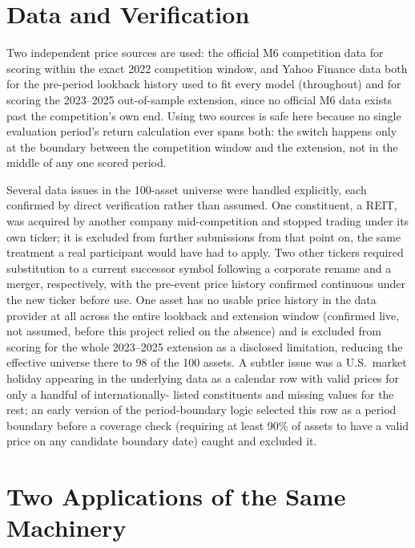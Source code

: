 \documentclass[11pt]{article}
\begin{document}
\section{Data and Verification}
\label{sec:data}

Two independent price sources are used: the official M6 competition data for
scoring within the exact 2022 competition window, and Yahoo Finance data both
for the pre-period lookback history used to fit every model (throughout) and
for scoring the 2023--2025 out-of-sample extension, since no official M6 data
exists past the competition's own end. Using two sources is safe here because
no single evaluation period's return calculation ever spans both: the switch
happens only at the boundary between the competition window and the
extension, not in the middle of any one scored period.

Several data issues in the 100-asset universe were handled explicitly, each
confirmed by direct verification rather than assumed. One constituent, a REIT,
was acquired by another company mid-competition and stopped trading under its
own ticker; it is excluded from further submissions from that point on, the
same treatment a real participant would have had to apply. Two other tickers
required substitution to a current successor symbol following a corporate
rename and a merger, respectively, with the pre-event price history confirmed
continuous under the new ticker before use. One asset has no usable price
history in the data provider at all across the entire lookback and extension
window (confirmed live, not assumed, before this project relied on the
absence) and is excluded from scoring for the whole 2023--2025 extension as a
disclosed limitation, reducing the effective universe there to 98 of the 100
assets. A subtler issue was a U.S.\ market holiday appearing in the underlying
data as a calendar row with valid prices for only a handful of internationally-
listed constituents and missing values for the rest; an early version of the
period-boundary logic selected this row as a period boundary before a
coverage check (requiring at least 90\% of assets to have a valid price on any
candidate boundary date) caught and excluded it.

\section{Two Applications of the Same Machinery}
\label{sec:applications}
\end{document}
